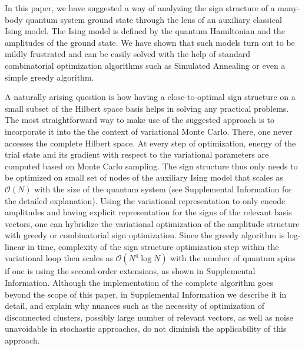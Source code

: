 In this paper, we have suggested a way of analyzing the sign structure of a many-body quantum system ground state through the lens of an auxiliary classical Ising model. The Ising model is defined by the quantum Hamiltonian and the amplitudes of the ground state. We have shown that such models turn out to be mildly frustrated and can be easily solved with the help of standard combinatorial optimization algorithms such as Simulated Annealing or even a simple greedy algorithm.

A naturally arising question is how having a close-to-optimal sign structure on a small subset of the Hilbert space basis helps in solving any practical problems. The most straightforward way to make use of the suggested approach is to incorporate it into the the context of variational Monte Carlo. There, one never accesses the complete Hilbert space. At every step of optimization, energy of the trial state and its gradient with respect to the variational parameters are computed based on Monte Carlo sampling. The sign structure thus only needs to be optimized on small set of nodes of the auxiliary Ising model that scales as $\mathcal{O}(N)$ with the size of the quantum system (see Supplemental Information for the detailed explanation). Using the variational representation to only encode amplitudes and having explicit representation for the signs of the relevant basis vectors, one can hybridize the variational optimization of the amplitude structure with greedy or combinatorial sign optimization. Since the greedy algorithm is log-linear in time, complexity of the sign structure optimization step within the variational loop then scales as $\mathcal{O}(N^4\log N)$ with the number of quantum spins if one is using the second-order extensions, as shown in Supplemental Information. Although the implementation of the complete algorithm goes beyond the scope of this paper, in Supplemental Information we describe it in detail, and explain why nuances such as the necessity of optimization of disconnected clusters, possibly large number of relevant vectors, as well as noise unavoidable in stochastic approaches, do not diminish the applicability of this approach.

